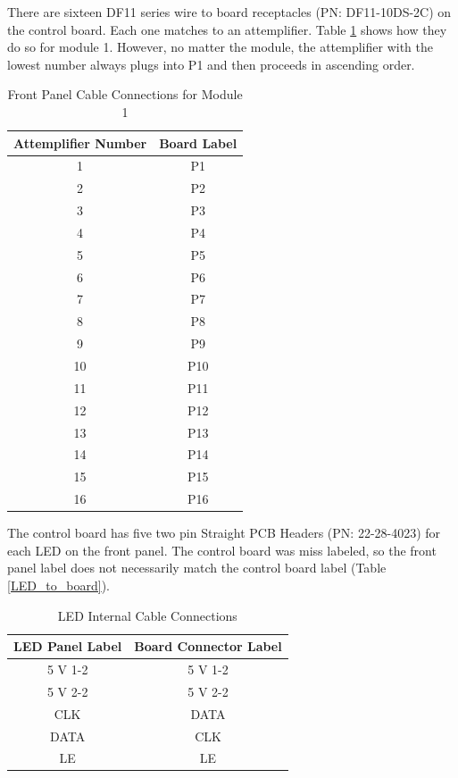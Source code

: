 \documentclass[12pt,a4paper,oneside]{article}
\begin{document}
There are sixteen DF11 series wire to board receptacles (PN: DF11-10DS-2C) on the control board. Each one matches to an attemplifier. Table \ref{tab:Attemp_to_board} shows how they do so for module 1. However, no matter the module, the attemplifier with the lowest number always plugs into P1 and then proceeds in ascending order. 

\begin{table}[H]
\centering
\caption{Front Panel Cable Connections for Module 1}
\begin{tabular}{@{}cc@{}}
\toprule
Attemplifier Number & Board Label\\ 
\midrule
1 & P1\\
2 & P2\\
3 & P3\\
4 & P4\\
5 & P5\\
6 & P6\\
7 & P7\\
8 & P8\\
9 & P9\\
10 & P10\\
11 & P11\\
12 & P12\\
13 & P13\\
14 & P14\\
15 & P15\\
16 & P16\\

\bottomrule            
\end{tabular}
\label{tab:Attemp_to_board}
\end{table}

The control board has five two pin Straight PCB Headers (PN: 22-28-4023) for each LED on the front panel. The control board was miss labeled, so the front panel label does not necessarily match the control board label (Table \ref{LED_to_board}). 

\begin{table}[H]
\caption{LED Internal Cable Connections}
\centering
\label{LED_to_board}
\begin{tabular}{@{}cc@{}}
\toprule
 LED Panel Label & Board Connector Label\\ 
\midrule
5 V 1-2 & 5 V 1-2\\
5 V 2-2 & 5 V 2-2\\
CLK & DATA\\
DATA & CLK\\
LE & LE\\

\bottomrule            
\end{tabular}
\label{table:LED_to_board}
\end{table}
\end{document}
